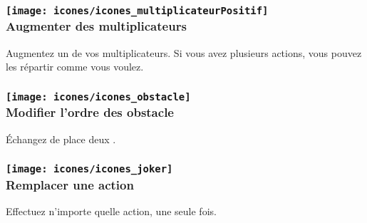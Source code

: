 \subsubsection*{\texttt{[image: icones/icones\_multiplicateurPositif]} \\ Augmenter des multiplicateurs}
Augmentez un de vos multiplicateurs. Si vous avez plusieurs actions, vous pouvez les répartir comme vous voulez.

\subsubsection*{\texttt{[image: icones/icones\_obstacle]} \\ Modifier l'ordre des obstacle}
Échangez de place deux \marqueursObstacles.

\subsubsection*{\texttt{[image: icones/icones\_joker]} \\ Remplacer une action}
Effectuez n'importe quelle action, une seule fois.